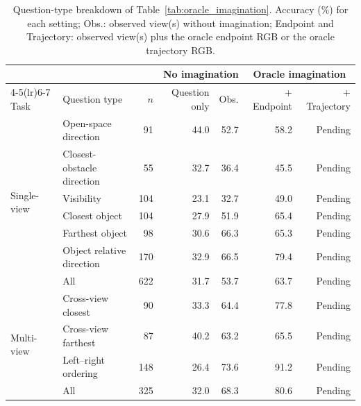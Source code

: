 \begin{table}[!tb]
\centering
\caption{Question-type breakdown of Table~\ref{tab:oracle_imagination}. Accuracy (\%)
for each setting; Obs.: observed view(s) without imagination; Endpoint and Trajectory:
observed view(s) plus the oracle endpoint RGB or the oracle trajectory RGB.}
\label{tab:oracle_by_type}
\begin{tabular}{llrrrrr}
\toprule
& & & \multicolumn{2}{c}{No imagination} & \multicolumn{2}{c}{Oracle imagination} \\
\cmidrule(lr){4-5}\cmidrule(lr){6-7}
Task & Question type & $n$ & Question only & Obs. & + Endpoint & + Trajectory \\
\midrule
\multirow{7}{*}{Single-view}
 & Open-space direction       &  91 & 44.0 & 52.7 & 58.2 & Pending \\
 & Closest-obstacle direction &  55 & 32.7 & 36.4 & 45.5 & Pending \\
 & Visibility                 & 104 & 23.1 & 32.7 & 49.0 & Pending \\
 & Closest object             & 104 & 27.9 & 51.9 & 65.4 & Pending \\
 & Farthest object            &  98 & 30.6 & 66.3 & 65.3 & Pending \\
 & Object relative direction  & 170 & 32.9 & 66.5 & 79.4 & Pending \\
 \cmidrule(l){2-7}
 & All                        & 622 & 31.7 & 53.7 & 63.7 & Pending \\
\midrule
\multirow{4}{*}{Multi-view}
 & Cross-view closest   &  90 & 33.3 & 64.4 & 77.8 & Pending \\
 & Cross-view farthest  &  87 & 40.2 & 63.2 & 65.5 & Pending \\
 & Left--right ordering & 148 & 26.4 & 73.6 & 91.2 & Pending \\
 \cmidrule(l){2-7}
 & All                  & 325 & 32.0 & 68.3 & 80.6 & Pending \\
\bottomrule
\end{tabular}
\end{table}

